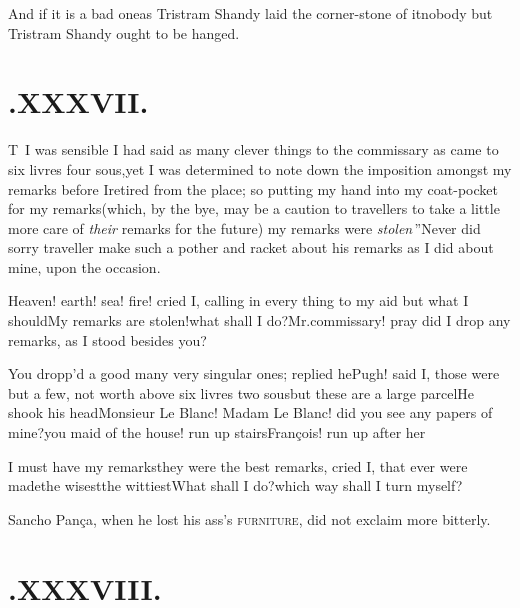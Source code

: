 \documentclass{article}
\begin{document}
\tsh And if it is a bad one\tsk as Tris\-tram
Shandy laid the corner-stone of it\tsk nobody but Tristram
Shandy ought to be hanged.

\section{.\enspace XXXVII.}

\lettrine{T}{\,} I was sensible I had said as
many clever things to the commissary as came to six livres four
sous,\break yet I was determined to note down the imposition amongst my
remarks before I\pb retired from the place; so putting my hand into my
coat-pocket for my remarks\tsk (which, by the bye, may be a
caution to travellers to take a little more care of \textit{their}
remarks for the future) \lqq my\break
\lqq remarks were \textit{stolen}\,”\tsh Never did\break
sorry traveller make
such a pother and racket about his remarks as I did about mine,
upon the occasion.

Heaven! earth! sea! fire! cried I, calling in every thing to my
aid but what I should\tsh My remarks are
stolen!\tsk what shall I do?\tsh Mr.\@ commissary! pray
did I drop any remarks, as I stood besides you?\tsh

You dropp’d a good many very singular ones; replied
he\tsh Pugh! said I, those were but a few, not worth above
six livres two sous\tsk but these are a large\pb
parcel\tsh He shook his head\tsh Monsieur Le
Blanc! Madam Le Blanc! did you see any papers of
mine?\tsk you maid of the house! run up
stairs\tsk François! run up after
her\tsh

\tsh I must have my remarks\tsh they were the best
remarks, cried I, that ever were made\tsk the wisest\tsk the
wittiest\tsk What shall I do?\tsk which way shall I turn
myself?

Sancho Pança, when he lost his ass’s
\textsc{furniture}, did not exclaim more bitterly.

\section{.\enspace XXXVIII.}
\end{document}
